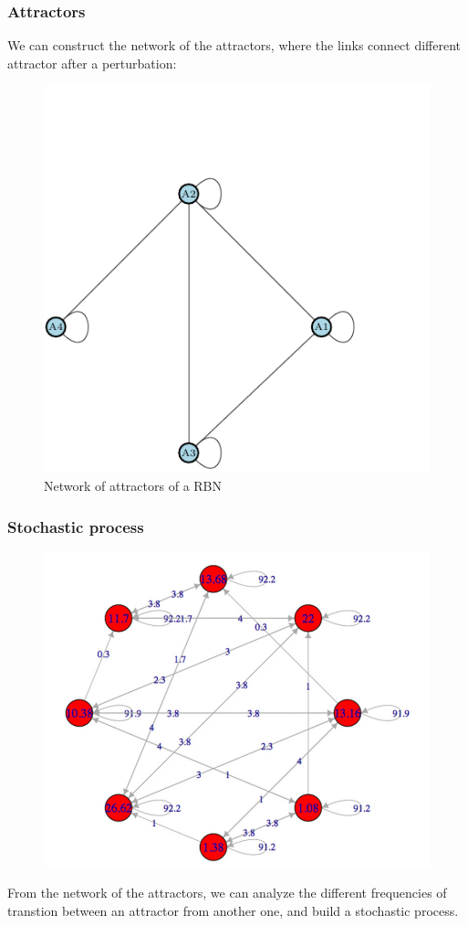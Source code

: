 \documentclass{beamer}
\begin{document}
\begin{frame}
\frametitle{Attractors}
We can construct the network of the attractors, where the links connect different attractor after a perturbation:
\begin{figure}
\centering
\includegraphics[scale=0.6]{fg5.pdf}
\caption{Network of attractors of a RBN}
\end{figure}
\end{frame}


\begin{frame}
\frametitle{Stochastic process}
\begin{figure}
\centering
\includegraphics[scale=0.2]{matrix.png}

\end{figure}
From the network of the attractors, we can analyze the different frequencies of transtion between an attractor from another one, and build a stochastic process.
\end{frame}
\end{document}
